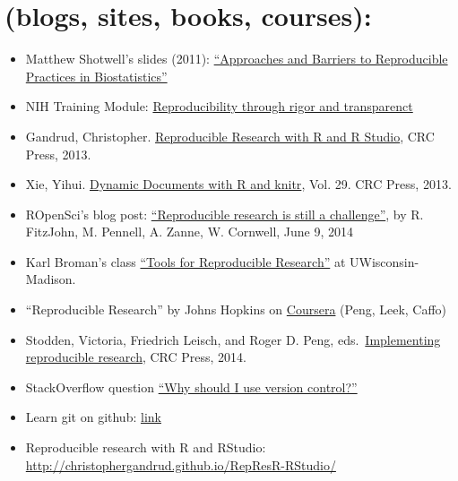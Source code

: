 \documentclass[
  12pt,
]{book}
\providecommand{\tightlist}{%
  \setlength{\itemsep}{0pt}\setlength{\parskip}{0pt}}
\begin{document}
\hypertarget{blogs-sites-books-courses}{%
\section{(blogs, sites, books, courses):}\label{blogs-sites-books-courses}}

\begin{itemize}
\tightlist
\item
  Matthew Shotwell's slides (2011): \href{https://rstudio-pubs-static.s3.amazonaws.com/177032_7be0bffdc2274d679c03b7228ac7b91f.html}{``Approaches and Barriers to Reproducible Practices in Biostatistics''}
\item
  NIH Training Module: \href{https://grants.nih.gov/reproducibility/module_1/presentation.html}{Reproducibility through rigor and transparenct}
\item
  Gandrud, Christopher. \href{https://englianhu.files.wordpress.com/2016/01/reproducible-research-with-r-and-studio-2nd-edition.pdf}{Reproducible Research with R and R Studio}, CRC Press, 2013.
\item
  Xie, Yihui. \href{http://static.latexstudio.net/wp-content/uploads/2014/03/DDR-Yihui-Xie-Chap1-3.pdf}{Dynamic Documents with R and knitr}, Vol. 29. CRC Press, 2013.
\item
  ROpenSci's blog post: \href{https://ropensci.org/blog/2014/06/09/reproducibility/}{``Reproducible research is still a challenge''}, by R. FitzJohn, M. Pennell, A. Zanne, W. Cornwell, June 9, 2014
\item
  Karl Broman's class \href{http://kbroman.org/Tools4RR/}{``Tools for Reproducible Research''} at UWisconsin-Madison.
\item
  ``Reproducible Research'' by Johns Hopkins on \href{https://www.coursera.org/learn/reproducible-research}{Coursera} (Peng, Leek, Caffo)
\item
  Stodden, Victoria, Friedrich Leisch, and Roger D. Peng, eds.~\href{https://www.jstatsoft.org/article/view/v061b02/v61b02.pdf}{Implementing reproducible research}, CRC Press, 2014.
\item
  StackOverflow question \href{https://stackoverflow.com/questions/1408450/why-should-i-use-version-control\#:~:text=Version\%20control\%20gives\%20you\%20the,using\%20tools.}{``Why should I use version control?''}
\item
  Learn git on github: \href{https://try.github.io/levels/1/challenges/1}{link}
\item
  Reproducible research with R and RStudio: \url{http://christophergandrud.github.io/RepResR-RStudio/}

\end{itemize}
\end{document}
